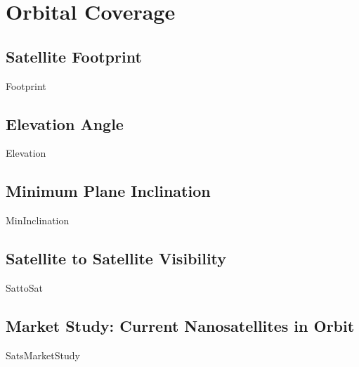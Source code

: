 \chapter{Orbital Coverage}


\section{Satellite Footprint}
{Footprint}

\section{Elevation Angle}
{Elevation}

\section{Minimum Plane Inclination}
{MinInclination}

\section{Satellite to Satellite Visibility}
{SattoSat}

\section{Market Study: Current Nanosatellites in Orbit}
{SatsMarketStudy}